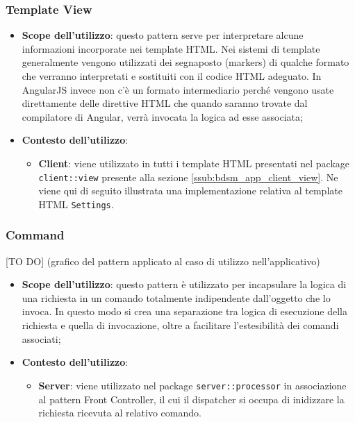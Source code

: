 	\subsubsection{Template View} %
	\label{ssub:template_view}
		\begin{itemize}
			\item \textbf{Scope dell'utilizzo}: questo pattern serve per interpretare alcune informazioni incorporate nei template HTML. Nei sistemi di template generalmente vengono utilizzati dei segnaposto (markers) di qualche formato che verranno interpretati e sostituiti con il codice HTML adeguato. In AngularJS invece non c'è un formato intermediario perché vengono usate direttamente delle direttive HTML che quando saranno trovate dal compilatore di Angular, verrà invocata la logica ad esse associata;
			\item \textbf{Contesto dell'utilizzo}:
				\begin{itemize}
					\item \textbf{Client}: viene utilizzato in tutti i template HTML presentati nel package \texttt{client::view} presente alla sezione \ref{ssub:bdsm_app_client_view}. \newline
					Ne viene qui di seguito illustrata una implementazione relativa al template HTML \texttt{Settings}. \newline
					[TO DO]
				\end{itemize}
		\end{itemize}


	\subsubsection{Command} %
	\label{ssub:command}
	[TO DO] (grafico del pattern applicato al caso di utilizzo nell'applicativo)
		\begin{itemize}
			\item \textbf{Scope dell'utilizzo}: questo pattern è utilizzato per incapsulare la logica di una richiesta in un comando totalmente indipendente dall'oggetto che lo invoca. In questo modo si crea una separazione tra logica di esecuzione della richiesta e quella di invocazione, oltre a facilitare l'estesibilità dei comandi associati;
			\item \textbf{Contesto dell'utilizzo}:
				\begin{itemize}
					\item \textbf{Server}: viene utilizzato nel package \texttt{server::processor} in associazione al pattern Front Controller, il cui il dispatcher si occupa di inidizzare la richiesta ricevuta al relativo comando.
				\end{itemize}
		\end{itemize}
